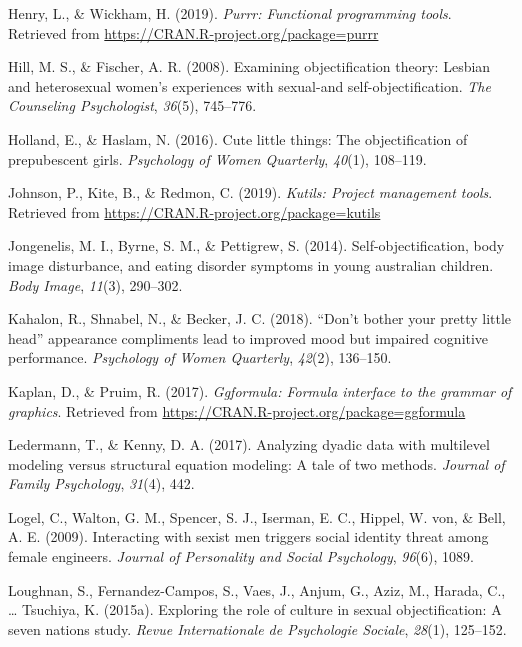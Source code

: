 \documentclass[
  man]{apa6}
\begin{document}
\hypertarget{ref-R-purrr}{}
Henry, L., \& Wickham, H. (2019). \emph{Purrr: Functional programming
tools}. Retrieved from \url{https://CRAN.R-project.org/package=purrr}

\hypertarget{ref-hill2008examining}{}
Hill, M. S., \& Fischer, A. R. (2008). Examining objectification theory:
Lesbian and heterosexual women's experiences with sexual-and
self-objectification. \emph{The Counseling Psychologist}, \emph{36}(5),
745--776.

\hypertarget{ref-holland2016}{}
Holland, E., \& Haslam, N. (2016). Cute little things: The
objectification of prepubescent girls. \emph{Psychology of Women
Quarterly}, \emph{40}(1), 108--119.

\hypertarget{ref-R-kutils}{}
Johnson, P., Kite, B., \& Redmon, C. (2019). \emph{Kutils: Project
management tools}. Retrieved from
\url{https://CRAN.R-project.org/package=kutils}

\hypertarget{ref-jongenelis2014}{}
Jongenelis, M. I., Byrne, S. M., \& Pettigrew, S. (2014).
Self-objectification, body image disturbance, and eating disorder
symptoms in young australian children. \emph{Body Image}, \emph{11}(3),
290--302.

\hypertarget{ref-kahalon2018don}{}
Kahalon, R., Shnabel, N., \& Becker, J. C. (2018). ``Don't bother your
pretty little head'' appearance compliments lead to improved mood but
impaired cognitive performance. \emph{Psychology of Women Quarterly},
\emph{42}(2), 136--150.

\hypertarget{ref-R-ggformula}{}
Kaplan, D., \& Pruim, R. (2017). \emph{Ggformula: Formula interface to
the grammar of graphics}. Retrieved from
\url{https://CRAN.R-project.org/package=ggformula}

\hypertarget{ref-ledermann2017analyzing}{}
Ledermann, T., \& Kenny, D. A. (2017). Analyzing dyadic data with
multilevel modeling versus structural equation modeling: A tale of two
methods. \emph{Journal of Family Psychology}, \emph{31}(4), 442.

\hypertarget{ref-logel2009interacting}{}
Logel, C., Walton, G. M., Spencer, S. J., Iserman, E. C., Hippel, W.
von, \& Bell, A. E. (2009). Interacting with sexist men triggers social
identity threat among female engineers. \emph{Journal of Personality and
Social Psychology}, \emph{96}(6), 1089.

\hypertarget{ref-loughnan2015exploring}{}
Loughnan, S., Fernandez-Campos, S., Vaes, J., Anjum, G., Aziz, M.,
Harada, C., \ldots{} Tsuchiya, K. (2015a). Exploring the role of culture
in sexual objectification: A seven nations study. \emph{Revue
Internationale de Psychologie Sociale}, \emph{28}(1), 125--152.
\end{document}
